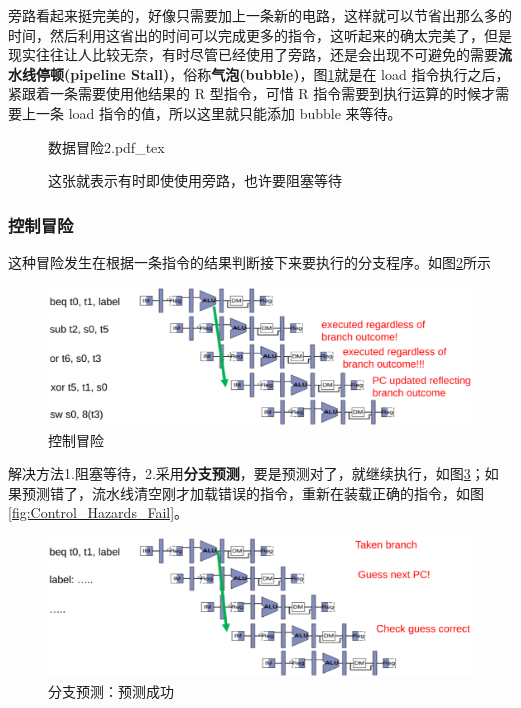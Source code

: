 旁路看起来挺完美的，好像只需要加上一条新的电路，这样就可以节省出那么多的时间，然后利用这省出的时间可以完成更多的指令，这听起来的确太完美了，但是现实往往让人比较无奈，有时尽管已经使用了旁路，还是会出现不可避免的需要\textbf{流水线停顿(pipeline Stall)}，俗称\textbf{气泡(bubble)}，图\ref{fig:Data_Hazards2}就是在 load 指令执行之后，紧跟着一条需要使用他结果的 R 型指令，可惜 R 指令需要到执行运算的时候才需要上一条 load 指令的值，所以这里就只能添加 bubble 来等待。

\begin{figure}[htbp]
    \centering
    \def\svgwidth{\columnwidth}
    {数据冒险2.pdf_tex}
    \caption{这张就表示有时即使使用旁路，也许要阻塞等待}
    \label{fig:Data_Hazards2}
\end{figure}


\subsubsection{控制冒险}
这种冒险发生在根据一条指令的结果判断接下来要执行的分支程序。如图\ref{fig:Control_Hazards}所示

\begin{figure}[htbp]
  \centering %
  \includegraphics[width=0.8 \textwidth]{figs/RISC-V/流水线/控制冒险.eps}
  \caption{控制冒险}
  \label{fig:Control_Hazards} %
\end{figure}

解决方法1.阻塞等待，2.采用\textbf{分支预测}，要是预测对了，就继续执行，如图\ref{fig:Control_Hazards_Success}；如果预测错了，流水线清空刚才加载错误的指令，重新在装载正确的指令，如图\ref{fig:Control_Hazards_Fail}。

\begin{figure}[htbp]
  \centering %
  \includegraphics[width=0.8 \textwidth]{figs/RISC-V/流水线/控制冒险_预测成功.eps}
  \caption{分支预测：预测成功}
  \label{fig:Control_Hazards_Success} %
\end{figure}

